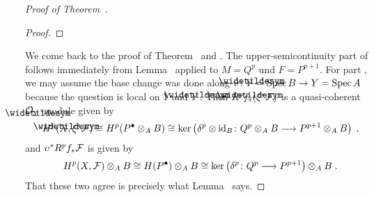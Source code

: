 \documentclass[a4paper,parskip=half,numbers=enddot, DIV=12]{scrreprt}
\begin{document}
\begin{proof}[Proof of Theorem~]
\begin{proof}
	\end{proof}
	We come back to the proof of Theorem~ and . The upper-semicontinuity part of  follows immediately from Lemma~ applied to $M=Q^p$ und $F=P^{p+1}$. For part , we may assume the base change was done along $\upsilon\colon \snake{Y}=\Spec B\morphism Y=\Spec A$ because the question is local on $Y$ and $\snake{Y}$. Then $R^p\snake{f}_*(\xi^*\Ff)$ is a quasi-coherent $\Oo_{\snake{Y}}$-module given by
	\begin{align*}
		H^p(\snake{X},\xi^*\Ff)\cong H^p(P^\bullet\otimes_AB)\cong \ker\left(\delta^p\otimes\id_B\colon Q^p\otimes_AB\morphism P^{p+1}\otimes_AB\right)\;,
	\end{align*}
	and $\upsilon^*R^pf_*\mathcal{F}$ is given by
	\begin{align*}
		H^p(X,\Ff)\otimes_AB\cong H(P^\bullet)\otimes_AB\cong\ker\left(\delta^p\colon Q^p\morphism P^{p+1}\right)\otimes_AB\;.
	\end{align*}
	That these two agree is precisely what Lemma~ says.
	

\end{proof}
\end{document}
